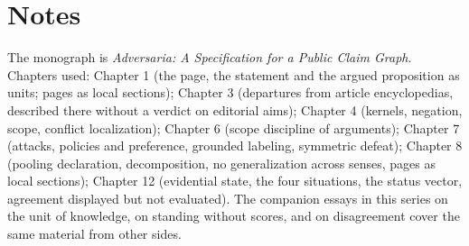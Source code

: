 \documentclass[11pt]{article}
\begin{document}
\section*{Notes}

The monograph is \emph{Adversaria: A Specification for a Public Claim Graph}. Chapters used: Chapter 1 (the page, the statement and the argued proposition as units; pages as local sections); Chapter 3 (departures from article encyclopedias, described there without a verdict on editorial aims); Chapter 4 (kernels, negation, scope, conflict localization); Chapter 6 (scope discipline of arguments); Chapter 7 (attacks, policies and preference, grounded labeling, symmetric defeat); Chapter 8 (pooling declaration, decomposition, no generalization across senses, pages as local sections); Chapter 12 (evidential state, the four situations, the status vector, agreement displayed but not evaluated). The companion essays in this series on the unit of knowledge, on standing without scores, and on disagreement cover the same material from other sides.
\end{document}
